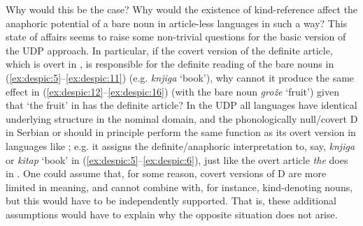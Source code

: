 \documentclass[output=paper,
modfonts
]{langscibook}
\begin{document}
	Why would this be the case? Why would the existence of kind-reference affect the
	anaphoric potential of a bare noun in article-less languages in such a way? This state of affairs
	seems to raise some non-trivial questions for the basic\pagebreak{} version of the UDP approach. In
	particular, if the covert version of the definite article, which is overt in , is responsible for
	the definite reading of the bare nouns in (\ref{ex:despic:5}--\ref{ex:despic:11}) (e.g. \textit{knjiga} `book'), why cannot it produce the
	same effect in (\ref{ex:despic:12}--\ref{ex:despic:16}) (with the bare noun \textit{gro\v z\dj e} `fruit') given that `the fruit' in   has the definite article? In the UDP all languages have identical underlying structure in the
	nominal domain, and the phonologically null/covert D in Serbian or  should in principle
	perform the same function as its overt version in languages like ; e.g. it assigns the
	definite/anaphoric interpretation to, say, \textit{knjiga} or \textit{kitap} `book' in (\ref{ex:despic:5}--\ref{ex:despic:6}), just like the overt
	article \textit{the} does in . One could assume that, for some reason, covert versions of D are more limited in meaning, and cannot combine with, for instance, kind-denoting nouns, but this would have to be independently supported. That is, these additional assumptions would have to explain why the opposite situation does not arise.
	
\end{document}
